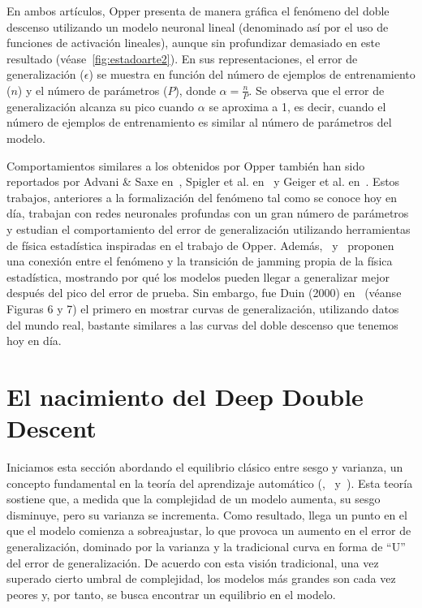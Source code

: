 En ambos artículos, Opper presenta de manera gráfica el fenómeno del doble descenso utilizando un modelo neuronal lineal (denominado así por el uso de funciones de activación lineales), aunque sin profundizar demasiado en este resultado (véase~\autoref{fig:estadoarte2}). En sus representaciones, el error de generalización ($\epsilon$) se muestra en función del número de ejemplos de entrenamiento ($n$) y el número de parámetros ($P$), donde $\alpha = \frac{n}{P}$. Se observa que el error de generalización alcanza su pico cuando $\alpha$ se aproxima a 1, es decir, cuando el número de ejemplos de entrenamiento es similar al número de parámetros del modelo.\newline

Comportamientos similares a los obtenidos por Opper también han sido reportados por Advani \& Saxe en~\cite{Advani2017}, Spigler et al. en~\cite{Spigler2019} y Geiger et al. en~\cite{Geiger2019}. Estos trabajos, anteriores a la formalización del fenómeno tal como se conoce hoy en día, trabajan con redes neuronales profundas con un gran número de parámetros y estudian el comportamiento del error de generalización utilizando herramientas de física estadística inspiradas en el trabajo de Opper. Además,~\cite{Spigler2019} y~\cite{Geiger2019} proponen una conexión entre el fenómeno y la transición de jamming propia de la física estadística, mostrando por qué los modelos pueden llegar a generalizar mejor después del pico del error de prueba. Sin embargo, fue Duin (2000) en~\cite{Duin2000} (véanse Figuras 6 y 7) el primero en mostrar curvas de generalización, utilizando datos del mundo real, bastante similares a las curvas del doble descenso que tenemos hoy en día.\newline

\section{El nacimiento del Deep Double Descent}\label{}

Iniciamos esta sección abordando el equilibrio clásico entre sesgo y varianza, un concepto fundamental en la teoría del aprendizaje automático (\cite{Geman1992},~\cite{Hastie2001} y~\cite{Bengio2010}). Esta teoría sostiene que, a medida que la complejidad de un modelo aumenta, su sesgo disminuye, pero su varianza se incrementa. Como resultado, llega un punto en el que el modelo comienza a sobreajustar, lo que provoca un aumento en el error de generalización, dominado por la varianza y la tradicional curva en forma de ``U'' del error de generalización. De acuerdo con esta visión tradicional, una vez superado cierto umbral de complejidad, los modelos más grandes son cada vez peores y, por tanto, se busca encontrar un equilibrio en el modelo.\newline

